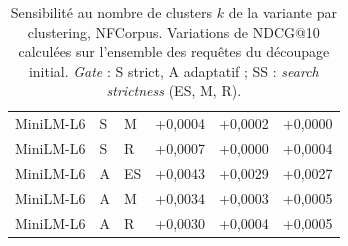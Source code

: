 \documentclass[a4paper,10pt]{article}
\begin{document}
\begin{table}[p]
\begin{tabular}{lllrrr}
MiniLM-L6 & S & M & +0,0004 & +0,0002 & +0,0000 \\
MiniLM-L6 & S & R & +0,0007 & +0,0000 & +0,0004 \\
MiniLM-L6 & A & ES & +0,0043 & +0,0029 & +0,0027 \\
MiniLM-L6 & A & M & +0,0034 & +0,0003 & +0,0005 \\
MiniLM-L6 & A & R & +0,0030 & +0,0004 & +0,0005 \\
\bottomrule
\end{tabular}
\caption{Sensibilité au nombre de clusters $k$ de la variante par clustering, NFCorpus. Variations de NDCG@10 calculées sur l'ensemble des requêtes du découpage initial. \textit{Gate} : S strict, A adaptatif ; SS : \textit{search strictness} (ES, M, R).}
\label{tab:s-clusters-nfcorpus}
\end{table}
\end{document}
